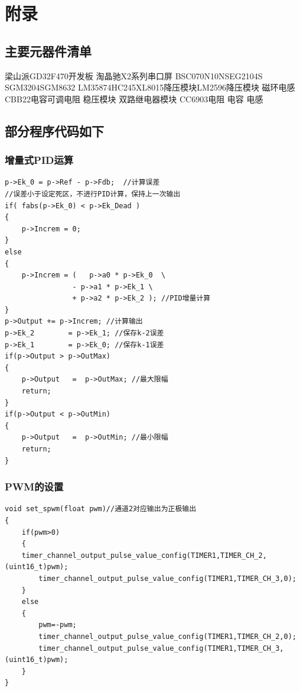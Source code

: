 \documentclass[a4paper,12pt]{article}
\begin{document}
\nocite{*}
\printbibliography


\newpage

\appendix
\section{附录}
\subsection*{主要元器件清单}
\noindent 梁山派GD32F470开发板 \quad 淘晶驰X2系列串口屏 
\quad BSC070N10NS\quad EG2104S \quad SGM3204\quad SGM8632
\quad LM358\quad 74HC245\quad  XL8015降压模块\quad LM2596降压模块
\quad 磁环电感\quad \newline CBB22电容\quad 可调电阻 \quad 稳压模块 
\quad 双路继电器模块 \quad CC6903\quad 电阻 \quad 电容 \quad 电感 \quad 
\subsection*{部分程序代码如下}
\subsubsection*{增量式PID运算}
\begin{verbatim}
p->Ek_0 = p->Ref - p->Fdb;  //计算误差
//误差小于设定死区，不进行PID计算，保持上一次输出
if( fabs(p->Ek_0) < p->Ek_Dead )
{
    p->Increm = 0;
}
else
{
    p->Increm = (   p->a0 * p->Ek_0  \
                - p->a1 * p->Ek_1 \
                + p->a2 * p->Ek_2 ); //PID增量计算  
}
p->Output += p->Increm; //计算输出
p->Ek_2        = p->Ek_1; //保存k-2误差
p->Ek_1        = p->Ek_0; //保存k-1误差
if(p->Output > p->OutMax)
{
    p->Output   =  p->OutMax; //最大限幅
    return;
}
if(p->Output < p->OutMin)
{
    p->Output   =  p->OutMin; //最小限幅
    return;
}
\end{verbatim} 
\subsubsection*{PWM的设置}
\begin{verbatim}
void set_spwm(float pwm)//通道2对应输出为正极输出
{
    if(pwm>0)
    {
    timer_channel_output_pulse_value_config(TIMER1,TIMER_CH_2,(uint16_t)pwm);
        timer_channel_output_pulse_value_config(TIMER1,TIMER_CH_3,0);
    }
    else
    {
        pwm=-pwm;
        timer_channel_output_pulse_value_config(TIMER1,TIMER_CH_2,0);
        timer_channel_output_pulse_value_config(TIMER1,TIMER_CH_3,(uint16_t)pwm);   
    }
}
\end{verbatim}
\end{document}
